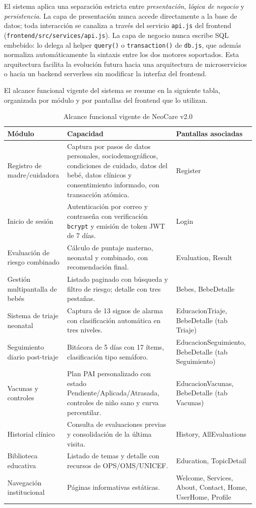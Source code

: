 \documentclass[12pt,letterpaper]{article}
\begin{document}
El sistema aplica una separación estricta entre \textit{presentación}, \textit{lógica de negocio} y \textit{persistencia}. La capa de presentación nunca accede directamente a la base de datos; toda interacción se canaliza a través del servicio \texttt{api.js} del frontend (\texttt{frontend/src/services/api.js}). La capa de negocio nunca escribe SQL embebido: lo delega al helper \texttt{query()} o \texttt{transaction()} de \texttt{db.js}, que además normaliza automáticamente la sintaxis entre los dos motores soportados. Esta arquitectura facilita la evolución futura hacia una arquitectura de microservicios o hacia un backend serverless sin modificar la interfaz del frontend.

El alcance funcional vigente del sistema se resume en la siguiente tabla, organizada por módulo y por pantallas del frontend que lo utilizan.

\begin{longtable}{p{}p{}p{}}
\caption{Alcance funcional vigente de NeoCare v2.0}\\\toprule
\textbf{Módulo} & \textbf{Capacidad} & \textbf{Pantallas asociadas} \\\midrule
\endhead
Registro de madre/cuidadora & Captura por pasos de datos personales, sociodemográficos, condiciones de cuidado, datos del bebé, datos clínicos y consentimiento informado, con transacción atómica. & Register\\\hline
Inicio de sesión & Autenticación por correo y contraseña con verificación \texttt{bcrypt} y emisión de token JWT de 7 días. & Login\\\hline
Evaluación de riesgo combinado & Cálculo de puntaje materno, neonatal y combinado, con recomendación final. & Evaluation, Result\\\hline
Gestión multipantalla de bebés & Listado paginado con búsqueda y filtro de riesgo; detalle con tres pestañas. & Bebes, BebeDetalle\\\hline
Sistema de triaje neonatal & Captura de 13 signos de alarma con clasificación automática en tres niveles. & EducacionTriaje, BebeDetalle (tab Triaje)\\\hline
Seguimiento diario post-triaje & Bitácora de 5 días con 17 ítems, clasificación tipo semáforo. & EducacionSeguimiento, BebeDetalle (tab Seguimiento)\\\hline
Vacunas y controles & Plan PAI personalizado con estado Pendiente/Aplicada/Atrasada, controles de niño sano y curva percentilar. & EducacionVacunas, BebeDetalle (tab Vacunas)\\\hline
Historial clínico & Consulta de evaluaciones previas y consolidación de la última visita. & History, AllEvaluations\\\hline
Biblioteca educativa & Listado de temas y detalle con recursos de OPS/OMS/UNICEF. & Education, TopicDetail\\\hline
Navegación institucional & Páginas informativas estáticas. & Welcome, Services, About, Contact, Home, UserHome, Profile\\\bottomrule
\end{longtable}
\end{document}
